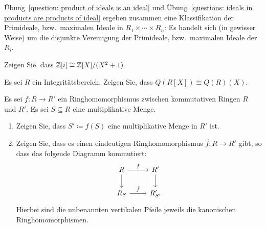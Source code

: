 \begin{remark*}
  Übung~\ref{question: product of ideals is an ideal} und Übung~\ref{questions: ideals in products are products of ideal} ergeben zusammen eine Klassifikation der Primideale, bzw.\ maximalen Ideale in $R_1 \times \dotsb \times R_n$:
  Es handelt sich (in gewisser Weise) um die disjunkte Vereinigung der Primideale, bzw.\ maximalen Ideale der $R_i$.
\end{remark*}


\begin{question}
  Zeigen Sie, dass $\mathbb{Z}[i] \cong \mathbb{Z}[X]/(X^2 + 1)$.
\end{question}




\begin{question}
  Es sei $R$ ein Integritätsbereich.
  Zeigen Sie, dass $Q(R[X]) \cong Q(R)(X)$.
\end{question}




\begin{question}
  Es sei $f \colon R \to R'$ ein Ringhomomorphismus zwischen kommutativen Ringen $R$ und $R'$.
  Es sei $S \subseteq R$ eine multiplikative Menge.
  \begin{enumerate}
    \item
      Zeigen Sie, dass $S' \coloneqq f(S)$ eine multiplikative Menge in $R'$ ist.
    \item
      Zeigen Sie, dass es einen eindeutigen Ringhomomorphismus $\hat{f} \colon R \to R'$ gibt, so dass das folgende Diagramm kommutiert:
      \[
        \begin{tikzcd}[ampersand replacement=\&]
              R
              \arrow{r}{f}
              \arrow{d}
          \&  R'
              \arrow{d}
          \\
              R_S
              \arrow{r}{\hat{f}}
          \&  R'_{S'}
        \end{tikzcd}
      \]
      Hierbei sind die unbenannten vertikalen Pfeile jeweils die kanonischen Ringhomomorphismen.
  \end{enumerate}
\end{question}


